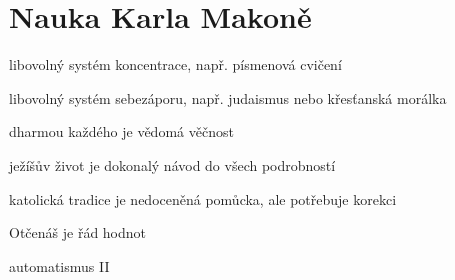 \chapter{Nauka Karla Makoně}

libovolný systém koncentrace, např. písmenová cvičení

libovolný systém sebezáporu, např. judaismus nebo křesťanská morálka

dharmou každého je vědomá věčnost

ježíšův život je dokonalý návod do všech podrobností

katolická tradice je nedoceněná pomůcka, ale potřebuje korekci

Otčenáš je řád hodnot

automatismus II

